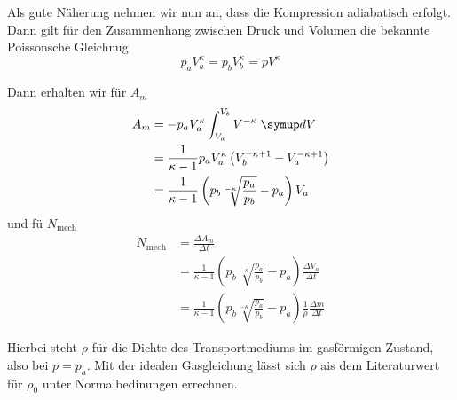 Als gute N\"aherung nehmen wir nun an, dass die Kompression adiabatisch erfolgt. Dann gilt 
f\"ur den Zusammenhang zwischen Druck und Volumen die bekannte Poissonsche Gleichnug
\begin{equation}
	p_a V_a^\kappa = p_b V_b^\kappa = p V^\kappa
	\label{eqn:poissonsche_Gleichung}
\end{equation}

Dann erhalten wir f\"ur $A_m$
\begin{align}
	A_m 
	&= -p_a V_a^\kappa \int_{V_a}^{V_b} V^{-\kappa} \; \symup dV
	\\
	&= \frac{1}{\kappa - 1} p_a V_a^\kappa \left(V_b^{-\kappa+1} - V_a^{-\kappa +1} \right)
	\\
	&= \frac{1}{\kappa - 1} \left( p_b \sqrt[-\kappa]{\frac{p_a}{p_b}} - p_a \right) V_a
	\label{eqn:a_m}
\end{align}
und f\"u $N_\text{mech}$
\begin{align}
	N_\text{mech}
	&= \frac{\Delta A_m}{\Delta t}
	\\
	&= \frac{1}{\kappa - 1}  \left( p_b \sqrt[-\kappa]{\frac{p_a}{p_b}} - p_a \right) 
	\frac{\Delta V_a}{\Delta t}
	\\
	&=  \frac{1}{\kappa - 1}  \left( p_b \sqrt[-\kappa]{\frac{p_a}{p_b}} - p_a \right)
	\frac{1}{\rho} \frac{\Delta m}{\Delta t}
	\label{eqn:kompressorleistung}
\end{align}

Hierbei steht $\rho$ f\"ur die Dichte des Transportmediums im gasf\"ormigen Zustand, also 
bei $p = p_a$. Mit der idealen Gasgleichung l\"asst sich $\rho$ ais dem Literaturwert f\"ur
$\rho_0$ unter Normalbedinungen errechnen.
